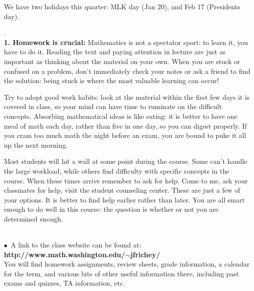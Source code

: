\documentclass[11 pt]{report}
\begin{document}
\vspace{.25cm} 

 We have two holidays this quarter: MLK day (Jan 20), and Feb 17 (Presidents day). 

\newpage 

. \\
{\bf1.  Homework is crucial:} Mathematics is not a spectator sport: to learn it, you have to do it.
Reading the text and paying attention in lecture are just as important as thinking about
the material on your own. When you are stuck or confused on a problem, don't immediately check your notes or 
ask a friend to find the solution: being stuck is where the most valuable learning can occur! 

\vspace{.2cm}

\noindent Try to adopt good work habits: look at
the material within the first few days it is covered in class, so your mind can have time to ruminate on the difficult concepts.
Absorbing mathematical ideas is like eating: it is better to have one meal of math each day, rather than five in one day, so you can digest properly. If you cram too much math the night before an exam, you are bound to puke it all up the next morning.  

\vspace{.25cm}  

 Most students will hit a wall at some point
during the course.  Some can't handle the large workload, while
others find difficulty with specific concepts in the course. When
these times arrive remember to ask for help.  Come to me, ask your classmates for help, visit the student counseling center.  These are just a
few of your options. It is better to find help earlier rather
than later. You are all smart enough to do well in this course: the
question is whether or not you are determined enough.
\vspace{0.3cm}

 \\
\noindent $\bullet$\ A link to the class website can be
found at: {\bf http://www.math.washington.edu/$\sim$jfrichey/} \\ You
will find homework assignments, review sheets, grade information, a
calendar for the term, and various bits of other useful information
there, including past exams and quizzes, TA information, etc.


\vspace{.2cm}
\end{document}
